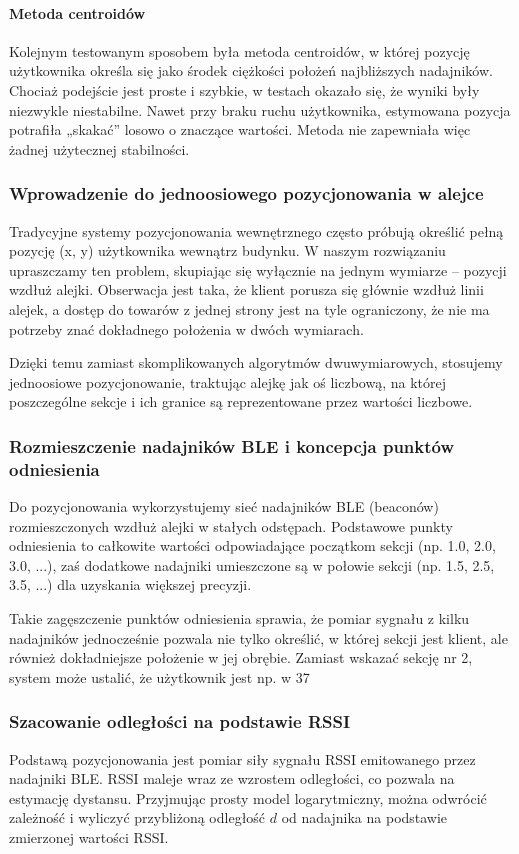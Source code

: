 \paragraph{Metoda centroidów}
Kolejnym testowanym sposobem była metoda centroidów, w której pozycję użytkownika określa się jako środek ciężkości położeń najbliższych nadajników. Chociaż podejście jest proste i szybkie, w testach okazało się, że wyniki były niezwykle niestabilne. Nawet przy braku ruchu użytkownika, estymowana pozycja potrafiła „skakać” losowo o znaczące wartości. Metoda nie zapewniała więc żadnej użytecznej stabilności.

\subsubsection{Wprowadzenie do jednoosiowego pozycjonowania w alejce}
Tradycyjne systemy pozycjonowania wewnętrznego często próbują określić pełną pozycję (x, y) użytkownika wewnątrz budynku. W naszym rozwiązaniu upraszczamy ten problem, skupiając się wyłącznie na jednym wymiarze – pozycji wzdłuż alejki. Obserwacja jest taka, że klient porusza się głównie wzdłuż linii alejek, a dostęp do towarów z jednej strony jest na tyle ograniczony, że nie ma potrzeby znać dokładnego położenia w dwóch wymiarach.

Dzięki temu zamiast skomplikowanych algorytmów dwuwymiarowych, stosujemy jednoosiowe pozycjonowanie, traktując alejkę jak oś liczbową, na której poszczególne sekcje i ich granice są reprezentowane przez wartości liczbowe.
\subsubsection{Rozmieszczenie nadajników BLE i koncepcja punktów odniesienia}
Do pozycjonowania wykorzystujemy sieć nadajników BLE (beaconów) rozmieszczonych wzdłuż alejki w stałych odstępach. Podstawowe punkty odniesienia to całkowite wartości odpowiadające początkom sekcji (np. 1.0, 2.0, 3.0, ...), zaś dodatkowe nadajniki umieszczone są w połowie sekcji (np. 1.5, 2.5, 3.5, ...) dla uzyskania większej precyzji.

Takie zagęszczenie punktów odniesienia sprawia, że pomiar sygnału z kilku nadajników jednocześnie pozwala nie tylko określić, w której sekcji jest klient, ale również dokładniejsze położenie w jej obrębie. Zamiast wskazać sekcję nr 2, system może ustalić, że użytkownik jest np. w 37%
\subsubsection{Szacowanie odległości na podstawie RSSI}
Podstawą pozycjonowania jest pomiar siły sygnału RSSI emitowanego przez nadajniki BLE. RSSI maleje wraz ze wzrostem odległości, co pozwala na estymację dystansu. Przyjmując prosty model logarytmiczny, można odwrócić zależność i wyliczyć przybliżoną odległość \( d \) od nadajnika na podstawie zmierzonej wartości RSSI.

